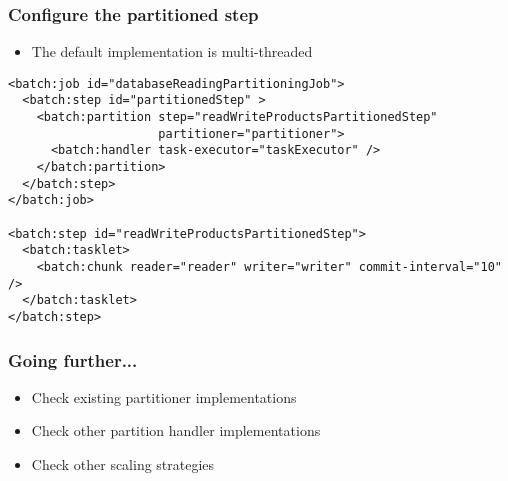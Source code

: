 \begin{frame}[fragile]
\frametitle{Configure the partitioned step}
\begin{itemize}
 \item The default implementation is multi-threaded
\end{itemize}

\lstset{language=XML}
\begin{lstlisting}
<batch:job id="databaseReadingPartitioningJob">
  <batch:step id="partitionedStep" >
    <batch:partition step="readWriteProductsPartitionedStep" 
                     partitioner="partitioner">
      <batch:handler task-executor="taskExecutor" />
    </batch:partition>
  </batch:step>
</batch:job>

<batch:step id="readWriteProductsPartitionedStep">
  <batch:tasklet>
    <batch:chunk reader="reader" writer="writer" commit-interval="10" />
  </batch:tasklet>	
</batch:step>
\end{lstlisting}
\end{frame}

\begin{frame}
 \frametitle{Going further...}
 \begin{itemize}
  \item Check existing partitioner implementations
  \item Check other partition handler implementations
  \item Check other scaling strategies
 \end{itemize}
\end{frame}

